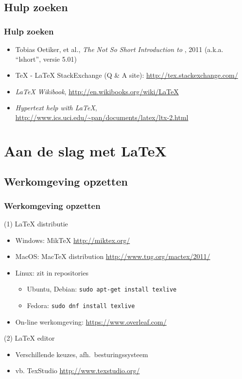 \documentclass[aspectratio=169]{beamer}
\begin{document}
\subsection{Hulp zoeken}

\begin{frame}
  \frametitle{Hulp zoeken}

  \begin{itemize}
  \item Tobias Oetiker, et al., \emph{The Not So Short Introduction to {\LaTeXe}}, 2011 (a.k.a. ``lshort'', versie 5.01)
  \item {\TeX} - {\LaTeX} StackExchange (Q \& A site): \url{http://tex.stackexchange.com/}
  \item \emph{{\LaTeX} Wikibook}, \url{http://en.wikibooks.org/wiki/LaTeX}
  \item \emph{Hypertext help with {\LaTeX}}, \url{http://www.ics.uci.edu/~pan/documents/latex/ltx-2.html}
  \end{itemize}

\end{frame}

\section{Aan de slag met {\LaTeX}}

\subsection{Werkomgeving opzetten}

\begin{frame}
  \frametitle{Werkomgeving opzetten}

(1) {\LaTeX} distributie
  
  \begin{itemize}
  \item Windows: MikTeX \url{http://miktex.org/}
  \item MacOS: MacTeX distribution \url{http://www.tug.org/mactex/2011/}
  \item Linux: zit in repositories
    \begin{itemize}
    \item Ubuntu, Debian: \texttt{sudo apt-get install texlive}
    \item Fedora: \texttt{sudo dnf install texlive}
    \end{itemize}
  \item On-line werkomgeving: \url{https://www.overleaf.com/}
  \end{itemize}

(2) {\LaTeX} editor

  \begin{itemize}
  \item Verschillende keuzes, afh.~besturingssysteem
  \item vb. TexStudio \url{http://www.texstudio.org/}
  \end{itemize}
\end{frame}
\end{document}
